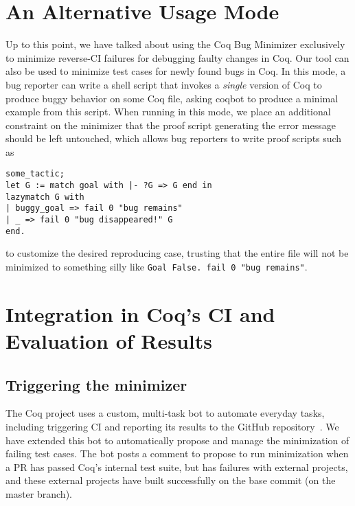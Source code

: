 \documentclass[a4paper,USenglish,cleveref,autoref,thm-restate]{lipics-v2021}
\makeatletter
\newcommand{\todo}[1]{%
\@latex@warning{TODO: \detokenize{#1} on page \thepage}%
\textcolor{red}{[\textbf{TODO:} #1]}}%
\makeatother
\begin{document}


\section{An Alternative Usage Mode}

Up to this point, we have talked about using the Coq Bug Minimizer exclusively to minimize reverse-CI failures for debugging faulty changes in Coq.
Our tool can also be used to minimize test cases for newly found bugs in Coq.
In this mode, a bug reporter can write a shell script that invokes a \emph{single} version of Coq to produce buggy behavior on some Coq file, asking coqbot to produce a minimal example from this script.
When running in this mode, we place an additional constraint on the minimizer that the proof script generating the error message should be left untouched,
which allows bug reporters to write proof scripts such as
\begin{verbatim}
some_tactic;
let G := match goal with |- ?G => G end in
lazymatch G with
| buggy_goal => fail 0 "bug remains"
| _ => fail 0 "bug disappeared!" G
end.
\end{verbatim}
to customize the desired reproducing case, trusting that the entire file will not be minimized to something silly like \verb|Goal False. fail 0 "bug remains"|.





\section{Integration in Coq's CI and Evaluation of Results}\label{sec:evaluation}

\subsection{Triggering the minimizer}

The Coq project uses a custom, multi-task bot to automate everyday tasks, including triggering CI and reporting its results to the GitHub repository~\cite{zimmermann:hal-03479327}. We have extended this bot to automatically propose and manage the minimization of failing test cases. The bot posts a comment to propose to run minimization when a PR has passed Coq's internal test suite, but has failures with external projects, and these external projects have built successfully on the base commit (on the master branch).
\end{document}
